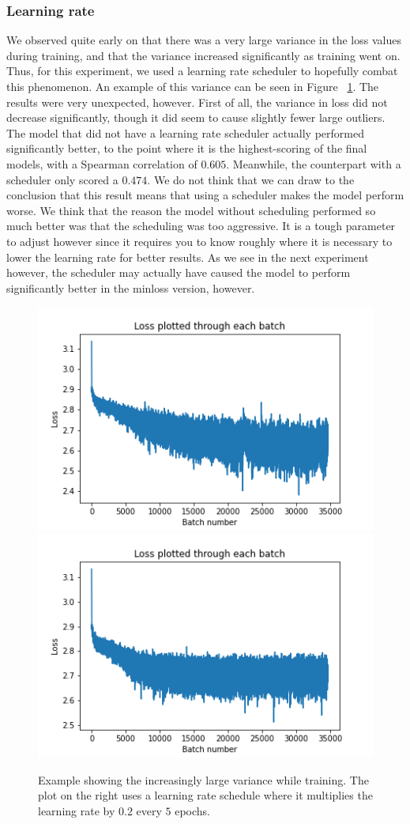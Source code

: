 \subsubsection{Learning rate}
We observed quite early on that there was a very large variance in the loss values during training, and that the variance increased significantly as training went on. Thus, for this experiment, we used a learning rate scheduler to hopefully combat this phenomenon. An example of this variance can be seen in Figure ~\ref{fig:loss_var}. The results were very unexpected, however. First of all, the variance in loss did not decrease significantly, though it did seem to cause slightly fewer large outliers. The model that did not have a learning rate scheduler actually performed significantly better, to the point where it is the highest-scoring of the final models, with a Spearman correlation of $0.605$. Meanwhile, the counterpart with a scheduler only scored a $0.474$. We do not think that we can draw to the conclusion that this result means that using a scheduler makes the model perform worse. We think that the reason the model without scheduling performed so much better was that the scheduling was too aggressive. It is a tough parameter to adjust however since it requires you to know roughly where it is necessary to lower the learning rate for better results. As we see in the next experiment however, the scheduler may actually have caused the model to perform significantly better in the minloss version, however.

\begin{figure}[!ht]
  \centering
  \includegraphics[width=0.5\linewidth]{latex/imgs/loss_log_1_layer_no_schedule_512.png}
  \includegraphics[width=0.5\linewidth]{latex/imgs/loss_log_1_layer_with_schedule_512.png}
  \caption{Example showing the increasingly large variance while training. The plot on the right uses a learning rate schedule where it multiplies the learning rate by $0.2$ every $5$ epochs.}
  \label{fig:loss_var}
\end{figure}


